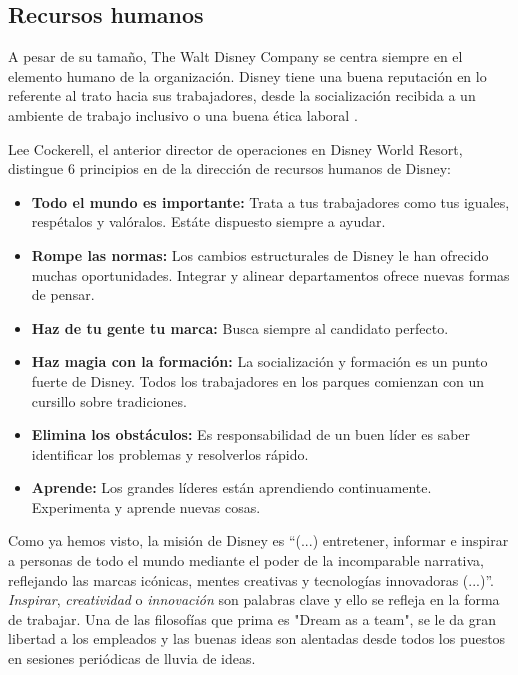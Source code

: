 \subsection{Recursos humanos}
A pesar de su tamaño, The Walt Disney Company se centra siempre en el elemento humano de la organización. Disney tiene una buena reputación en lo referente al trato hacia sus trabajadores, desde la socialización recibida a un ambiente de trabajo inclusivo o una buena ética laboral .

Lee Cockerell, el anterior director de operaciones en Disney World Resort, distingue 6 principios en de la dirección de recursos humanos de Disney:

\begin{itemize}

\item
\textbf{Todo el mundo es importante:} Trata a tus trabajadores como tus iguales, respétalos y valóralos. Estáte dispuesto siempre a ayudar.

\item
\textbf{Rompe las normas:} Los cambios estructurales de Disney le han ofrecido muchas oportunidades. Integrar y alinear departamentos ofrece nuevas formas de pensar.

\item
\textbf{Haz de tu gente tu marca:} Busca siempre al candidato perfecto.

\item
\textbf{Haz magia con la formación:} La socialización y formación es un punto fuerte de Disney. Todos los trabajadores en los parques comienzan con un cursillo sobre tradiciones.

\item
\textbf{Elimina los obstáculos:} Es responsabilidad de un buen líder es saber identificar los problemas y resolverlos rápido.

\item
\textbf{Aprende:} Los grandes líderes están aprendiendo continuamente. Experimenta y aprende nuevas cosas.

\end{itemize}

Como ya hemos visto, la misión de Disney es \textquotedblleft (...) entretener, informar e inspirar a personas de todo el mundo mediante el poder de la incomparable narrativa, reflejando las marcas icónicas, mentes creativas y tecnologías innovadoras (...)\textquotedblright. \textit{Inspirar}, \textit{creatividad} o \textit{innovación} son palabras clave y ello se refleja en la forma de trabajar. Una de las filosofías que prima es "Dream as a team", se le da gran libertad a los empleados y las buenas ideas son alentadas desde todos los puestos en sesiones periódicas de lluvia de ideas.